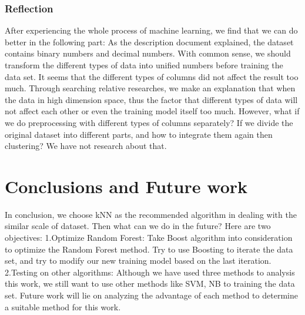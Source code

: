 \documentclass[12pt]{report}
\begin{document}
\subsubsection*{Reflection}
After experiencing the whole process of machine learning, we find that we can do better in the following part:
\newline
\newline
As the description document explained, the dataset contains binary numbers and decimal numbers. With common sense, we should transform the different types of data into unified numbers before training the data set. 
\newline
\newline It seems that the different types of columns did not affect the result too much. Through searching relative researches, we make an explanation that when the data in high dimension space, thus the factor that different types of data will not affect each other or even the training model itself too much.
\newline
\newline
However, what if we do preprocessing with different types of columns separately? If we divide the original dataset into different parts, and how to integrate them again then clustering? We have not research about that.

\section*{Conclusions and Future work}
In conclusion, we choose kNN as the recommended algorithm in dealing with the similar scale of dataset.
\newline
\newline 
Then what can we do in the future? Here are two objectives:
\newline  1.Optimize Random Forest: 
\newline Take Boost algorithm into consideration to optimize the Random Forest method. Try to use Boosting to iterate the data set, and try to modify our new training model based on the last iteration.   
\newline 2.Testing on other algorithms:
\newline Although we have used three methods to analysis this work, we still want to use other methods like SVM, NB to training the data set. Future work will lie on analyzing the advantage of each method to determine a suitable method for this work.   
\end{document}
